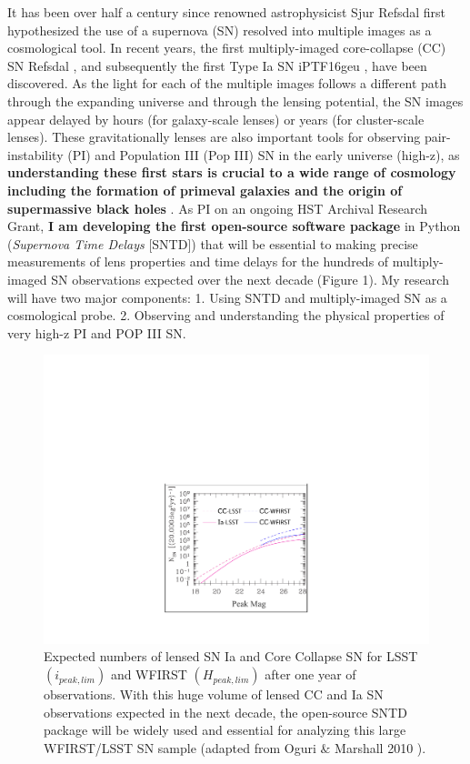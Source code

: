 It has been over half a century since renowned astrophysicist Sjur
Refsdal first hypothesized the use of a supernova (SN) resolved into
multiple images as a cosmological tool. In recent years, the first
multiply-imaged core-collapse (CC) SN Refsdal \citep{Kelly:2015a}, and
subsequently the first Type Ia SN iPTF16geu \citep{Goobar:2016}, have
been discovered. As the light for each of the multiple
images follows a different path through the expanding universe and
through the lensing potential, the SN images appear delayed by hours
(for galaxy-scale lenses) or years (for cluster-scale lenses). These
gravitationally lenses are also important tools for observing
pair-instability (PI) and Population III (Pop III) SN in the early
universe (high-z), as \textbf{understanding these first stars is crucial to a
wide range of cosmology including the formation of primeval galaxies and the origin of
supermassive black holes} \cite{Whalen:2013}. As PI on an ongoing HST
Archival Research Grant, \textbf{I am developing the first open-source
software package} in Python (\textit{Supernova Time Delays} [SNTD])
that will be essential to making precise measurements of lens
properties and time delays for the hundreds of multiply-imaged SN
observations expected over the next decade (Figure 1). My research
will have two major components: 1. Using SNTD and multiply-imaged
SN as a cosmological probe. 2. Observing and understanding the
physical properties of very high-z PI and POP III SN.

\begin{figure}
\centering
\includegraphics[height=.4\textwidth]{FIG/wfirst_lsst}
\caption{
\noindent\fontsize{10}{14}\selectfont
Expected numbers of lensed SN Ia and Core Collapse SN for LSST
$(i_{peak,lim})$ and WFIRST $(H_{peak,lim})$ after one year of
observations. With this huge volume of lensed CC and Ia SN
observations expected in the next decade, the open-source SNTD package
will be widely used and essential for analyzing this large WFIRST/LSST SN sample
(adapted from Oguri $\&$ Marshall 2010 \cite{Oguri:2010a}).}
\end{figure}

